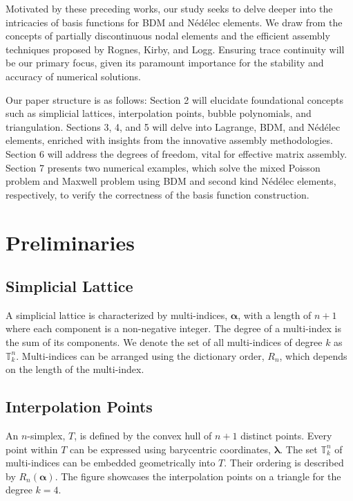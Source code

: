 \documentclass[12pt, a4paper]{article}
\newcommand{\bs}{\boldsymbol}
\begin{document}
Motivated by these preceding works, our study seeks to delve deeper into the
intricacies of basis functions for BDM and Nédélec elements. We draw from the
concepts of partially discontinuous nodal elements and the efficient assembly
techniques proposed by Rognes, Kirby, and Logg. Ensuring trace continuity will
be our primary focus, given its paramount importance for the stability and
accuracy of numerical solutions.

Our paper structure is as follows: Section 2 will elucidate foundational
concepts such as simplicial lattices, interpolation points, bubble polynomials,
and triangulation. Sections 3, 4, and 5 will delve into Lagrange, BDM, and
Nédélec elements, enriched with insights from the innovative assembly
methodologies. Section 6 will address the degrees of freedom, vital for
effective matrix assembly.  Section 7 presents two numerical examples, which solve the mixed Poisson
problem and Maxwell problem using BDM and second kind Nédélec elements,
respectively, to verify the correctness of the basis function construction.


\section{Preliminaries}

\subsection{Simplicial Lattice}

A simplicial lattice is characterized by multi-indices, $\boldsymbol\alpha$, with a length
of $n+1$ where each component is a non-negative integer. The degree of a
multi-index is the sum of its components. We denote the set of all multi-indices of
degree $k$ as $\mathbb T^n_k$. Multi-indices can be arranged using the dictionary order, \(R_n\),
which depends on the length of the multi-index.

\subsection{Interpolation Points}

An \(n\)-simplex, \(T\), is defined by the convex hull of \(n+1\) distinct points.
Every point within \(T\) can be expressed using barycentric coordinates, \(\bs\lambda\).
The set \(\mathbb T^n_k\) of multi-indices can be embedded geometrically into \(T\).
Their ordering is described by \(R_n(\bs\alpha)\). The figure 
showcases the interpolation points on a triangle for the degree \(k=4\).
\end{document}
